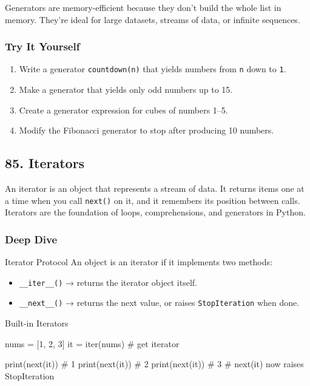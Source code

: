 \documentclass[
  letterpaper,
  DIV=11,
  numbers=noendperiod]{scrreprt}
\newenvironment{Shaded}{\begin{snugshade}}{\end{snugshade}}
\newcommand{\BuiltInTok}[1]{\textcolor[rgb]{0.00,0.23,0.31}{#1}}
\newcommand{\CommentTok}[1]{\textcolor[rgb]{0.37,0.37,0.37}{#1}}
\newcommand{\DecValTok}[1]{\textcolor[rgb]{0.68,0.00,0.00}{#1}}
\newcommand{\NormalTok}[1]{\textcolor[rgb]{0.00,0.23,0.31}{#1}}
\newcommand{\OperatorTok}[1]{\textcolor[rgb]{0.37,0.37,0.37}{#1}}
\providecommand{\tightlist}{%
  \setlength{\itemsep}{0pt}\setlength{\parskip}{0pt}}
\begin{document}
Generators are memory-efficient because they don't build the whole list
in memory. They're ideal for large datasets, streams of data, or
infinite sequences.

\subsubsection{Try It Yourself}\label{try-it-yourself-83}

\begin{enumerate}
\def\labelenumi{\arabic{enumi}.}
\tightlist
\item
  Write a generator \texttt{countdown(n)} that yields numbers from
  \texttt{n} down to \texttt{1}.
\item
  Make a generator that yields only odd numbers up to 15.
\item
  Create a generator expression for cubes of numbers 1--5.
\item
  Modify the Fibonacci generator to stop after producing 10 numbers.
\end{enumerate}

\subsection{85. Iterators}\label{iterators}

An iterator is an object that represents a stream of data. It returns
items one at a time when you call \texttt{next()} on it, and it
remembers its position between calls. Iterators are the foundation of
loops, comprehensions, and generators in Python.

\subsubsection{Deep Dive}\label{deep-dive-84}

Iterator Protocol An object is an iterator if it implements two methods:

\begin{itemize}
\tightlist
\item
  \texttt{\_\_iter\_\_()} → returns the iterator object itself.
\item
  \texttt{\_\_next\_\_()} → returns the next value, or raises
  \texttt{StopIteration} when done.
\end{itemize}

Built-in Iterators

\begin{Shaded}
\begin{Highlighting}[]
\NormalTok{nums }\OperatorTok{=}\NormalTok{ [}\DecValTok{1}\NormalTok{, }\DecValTok{2}\NormalTok{, }\DecValTok{3}\NormalTok{]}
\NormalTok{it }\OperatorTok{=} \BuiltInTok{iter}\NormalTok{(nums)   }\CommentTok{\# get iterator}

\BuiltInTok{print}\NormalTok{(}\BuiltInTok{next}\NormalTok{(it))   }\CommentTok{\# 1}
\BuiltInTok{print}\NormalTok{(}\BuiltInTok{next}\NormalTok{(it))   }\CommentTok{\# 2}
\BuiltInTok{print}\NormalTok{(}\BuiltInTok{next}\NormalTok{(it))   }\CommentTok{\# 3}
\CommentTok{\# next(it) now raises StopIteration}
\end{Highlighting}
\end{Shaded}
\end{document}
